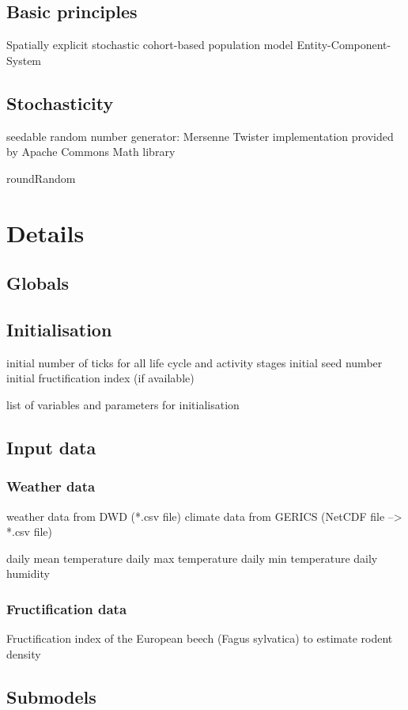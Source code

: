 \documentclass[a4paper, 11pt]{article}
\begin{document}
\subsection{Basic principles}
Spatially explicit stochastic cohort-based population model
Entity-Component-System


\subsection{Stochasticity}
seedable random number generator: 
Mersenne Twister implementation 
provided by Apache Commons Math library

roundRandom


\section{Details}

\subsection{Globals}


\subsection{Initialisation}
initial number of ticks for all life cycle and activity stages 
initial seed number
initial fructification index (if available)

list of variables and parameters for initialisation


\subsection{Input data}

\subsubsection{Weather data}
weather data from DWD (*.csv file)
climate data from GERICS (NetCDF file --> *.csv file) 

daily mean temperature
daily max temperature
daily min temperature
daily humidity


\subsubsection{Fructification data}
Fructification index of the European beech (Fagus sylvatica)
to estimate rodent density


\subsection{Submodels}
\end{document}
